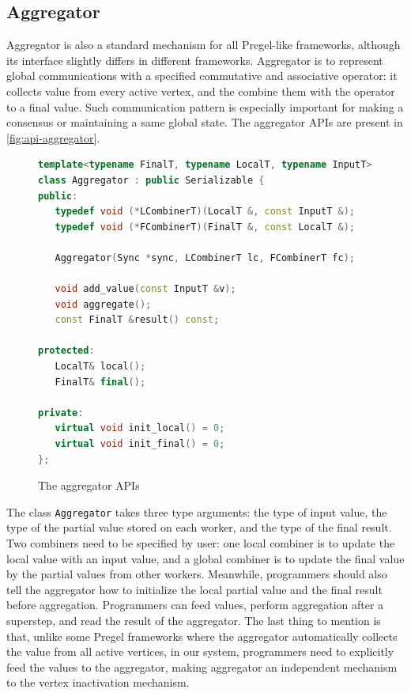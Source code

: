 \documentclass{sokendai_thesis} %
\begin{document}
\subsection{Aggregator}

Aggregator is also a standard mechanism for all Pregel-like frameworks, although its interface slightly differs in different frameworks.
Aggregator is to represent global communications with a specified commutative and associative operator: it collects value from every active vertex, and the combine them with the operator to a final value.
Such communication pattern is especially important for making a consensus or maintaining a same global state.
The aggregator APIs are present in \autoref{fig:api-aggregator}.

\begin{figure}[ht]
\centering
\vspace{-2ex}
\begin{lstlisting}[basicstyle=\small\ttfamily,numbers=none,language=c++]
template<typename FinalT, typename LocalT, typename InputT>
class Aggregator : public Serializable {
public:
   typedef void (*LCombinerT)(LocalT &, const InputT &);
   typedef void (*FCombinerT)(FinalT &, const LocalT &);

   Aggregator(Sync *sync, LCombinerT lc, FCombinerT fc);

   void add_value(const InputT &v);
   void aggregate();
   const FinalT &result() const;

protected:
   LocalT& local();
   FinalT& final();

private:
   virtual void init_local() = 0;
   virtual void init_final() = 0;
};
\end{lstlisting}
\vspace{-2ex}
\caption{The aggregator APIs}
\label{fig:api-aggregator}
\end{figure}

The class \texttt{Aggregator} takes three type arguments: the type of input value, the type of the partial value stored on each worker, and the type of the final result.
Two combiners need to be specified by user: one local combiner is to update the local value with an input value, and a global combiner is to update the final value by the partial values from other workers.
Meanwhile, programmers should also tell the aggregator how to initialize the local partial value and the final result before aggregation.
Programmers can feed values, perform aggregation after a superstep, and read the result of the aggregator.
The last thing to mention is that, unlike some Pregel frameworks where the aggregator automatically collects the value from all active vertices, in our system, programmers need to explicitly feed the values to the aggregator, making aggregator an independent mechanism to the vertex inactivation mechanism.
\end{document}
